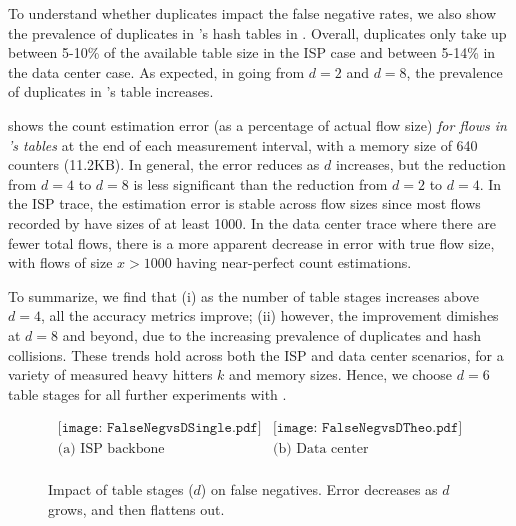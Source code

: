 To understand whether duplicates impact the false negative rates, we also show
the prevalence of duplicates in \TheSystem's hash tables in
. Overall, duplicates only take up between 5-10\% of the
available table size in the ISP case and between 5-14\% in the data center
case. As expected, in going from $d=2$ and $d=8$, the prevalence of duplicates
in \TheSystem's table increases.

 shows the count estimation error (as a
percentage of actual flow size) {\em for flows in
  \TheSystem's tables} at the end of each measurement interval, with a memory
size of 640 counters (11.2KB).
%
In general, the
error reduces as $d$ increases, but the reduction from $d=4$ to $d=8$ is less
significant than the reduction from $d=2$ to $d=4$.
%
In the ISP trace, the estimation error is stable across flow sizes since most
flows recorded by \TheSystem have sizes of at least 1000.
%
In the data center trace where there are fewer total flows, there is a more
apparent decrease in error with true flow size, with flows of size $x > 1000$
having near-perfect count estimations.

 To summarize, we find that (i) as the
number of table stages increases above $d=4$, all the accuracy metrics improve;
(ii) however, the improvement dimishes at $d=8$ and beyond, due to the increasing
prevalence of duplicates and hash collisions. These trends hold across both the
ISP and data center scenarios, for a variety of measured heavy hitters $k$ and
memory sizes. Hence, we choose $d=6$ table stages for all further experiments
with \TheSystem.


\begin{figure}
  \centering
  \[
  \begin{array}{ccc}
	\texttt{[image: FalseNegvsDSingle.pdf]} &
	\texttt{[image: FalseNegvsDTheo.pdf]}
    \\
    \mbox{(a) ISP backbone} & \mbox{(b) Data center} \\
  \end{array}
  \]
\caption{Impact of table stages ($d$) on false negatives. Error
  decreases as $d$ grows, and then flattens out.}
\label{fig:falseNegvsD}
\end{figure}

